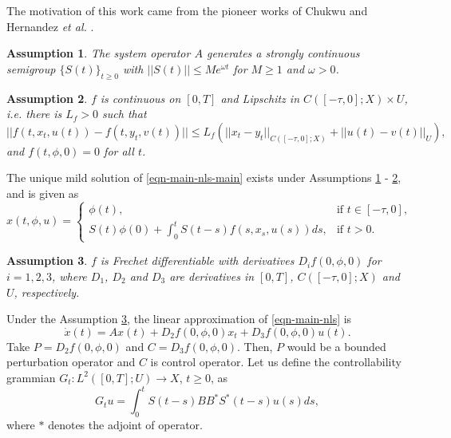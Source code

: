 \documentclass[12pt]{llncs}
\newtheorem{asmp}{Assumption}
\begin{document}
The motivation of this work came from the pioneer works of Chukwu \cite{Chukwu91delay} and Hernandez \emph{et al.} \cite{hernandez2020alka}.

\begin{asmp}\label{asmp-A}
The system operator $A$ generates a strongly continuous semigroup $\{S(t)\}_{t \ge 0}$ with $||S(t)|| \le M e^{\omega t}$ for $M \ge 1$ and $\omega > 0$.
\end{asmp}

\begin{asmp}\label{asmp-f-Lips}
$f$ is continuous on $[0,T]$ and Lipschitz in $C([-\tau,0];X) \times U$, i.e. there is $L_f > 0$ such that
        \begin{equation*}
          ||f(t,x_t,u(t)) - f(t,y_t,v(t))|| \le L_f (||x_t - y_t||_{C([-\tau,0];X)} + ||u(t) - v(t)||_U),
        \end{equation*}
                and $f(t,\phi,0)=0$ for all $t$.
\end{asmp}

The unique mild solution of \eqref{eqn-main-nls-main} exists under Assumptions \ref{asmp-A} - \ref{asmp-f-Lips}, and is given as
\begin{equation*}
x(t,\phi,u) = \begin{cases}
                \phi(t), & \mbox{if } t \in [-\tau,0], \\
                S(t)\phi(0) + \int_{0}^{t} S(t-s) f(s,x_s,u(s))ds , & \mbox{if } t > 0.
              \end{cases}
\end{equation*}

\begin{asmp}\label{asmp-f-Frechet}
$f$ is Frechet differentiable %
with derivatives $D_i f(0,\phi,0)$ for $i = 1,2,3$, where $D_1$, $D_2$ and $D_3$ are derivatives in $[0,T]$, $C([-\tau,0];X)$ and $U$, respectively.
\end{asmp}

Under the Assumption \ref{asmp-f-Frechet}, the linear approximation of \eqref{eqn-main-nls} is
\begin{equation}\label{eqn-lin-approx}
\dot{x}(t) = A x(t) + D_2 f(0,\phi,0)x_t + D_3 f(0,\phi,0)u(t).
\end{equation}
Take $P = D_2 f(0,\phi,0)$ and $C = D_3 f(0,\phi,0)$. Then, $P$ would be a bounded perturbation operator and $C$ is control operator. Let us define the controllability grammian $G_t : L^2([0,T];U) \rightarrow X$, $t \ge 0$, as
\begin{equation}\label{eqn-cg-dfn}
G_t u = \int_{0}^{t} S(t-s) B B^* S^*(t-s)u(s)ds,
\end{equation}
where $*$ denotes the adjoint of operator.
\end{document}

